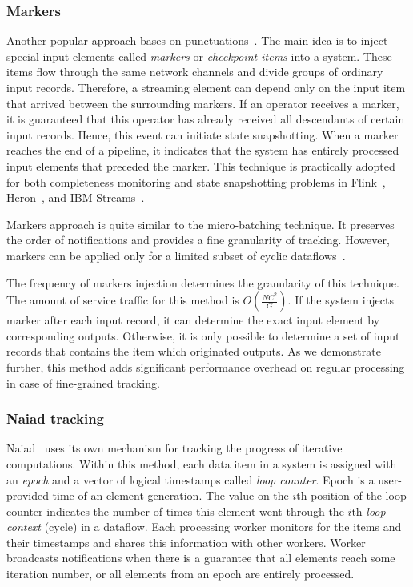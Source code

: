 \subsubsection{Markers}

Another popular approach bases on punctuations~\cite{Tucker:2003:EPS:776752.776780}. The main idea is to inject special input elements called {\em markers} or {\em checkpoint items} into a system. These items flow through the same network channels and divide groups of ordinary input records. Therefore, a streaming element can depend only on the input item that arrived between the surrounding markers. If an operator receives a marker, it is guaranteed that this operator has already received all descendants of certain input records. Hence, this event can initiate state snapshotting. When a marker reaches the end of a pipeline, it indicates that the system has entirely processed input elements that preceded the marker. This technique is practically adopted for both completeness monitoring and state snapshotting problems in Flink~\cite{Carbone:2017:SMA:3137765.3137777}, Heron~\cite{Kulkarni:2015:THS:2723372.2742788}, and IBM Streams~\cite{jacques2016consistent}. 

Markers approach is quite similar to the micro-batching technique. It preserves the order of notifications and provides a fine granularity of tracking. However, markers can be applied only for a limited subset of cyclic dataflows~\cite{carbone2018scalable}. 

The frequency of markers injection determines the granularity of this technique. The amount of service traffic for this method is $O(\frac{NC^2}{G})$. If the system injects marker after each input record, it can determine the exact input element by corresponding outputs. Otherwise, it is only possible to determine a set of input records that contains the item which originated outputs. As we demonstrate further, this method adds significant performance overhead on regular processing in case of fine-grained tracking.

\subsubsection{Naiad tracking}

Naiad~\cite{Murray:2013:NTD:2517349.2522738} uses its own mechanism for tracking the progress of iterative computations. Within this method, each data item in a system is assigned with an {\em epoch} and a vector of logical timestamps called {\em loop counter}. Epoch is a user-provided time of an element generation. The value on the $i$th position of the loop counter indicates the number of times this element went through the $i$th {\em loop context} (cycle) in a dataflow. Each processing worker monitors for the items and their timestamps and shares this information with other workers. Worker broadcasts notifications when there is a guarantee that all elements reach some iteration number, or all elements from an epoch are entirely processed.

